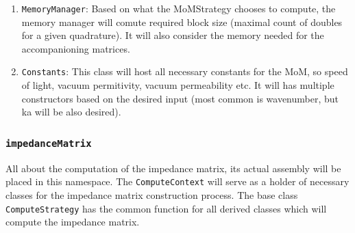 \documentclass[9pt]{article}
\begin{document}
    \begin{enumerate}[label=\Roman*.]
        \item \texttt{MemoryManager}: Based on what the MoMStrategy chooses to compute, the memory manager will comute required block size (maximal count of doubles for a given quadrature). It will also consider the memory needed for the accompanioning matrices.
        \item \texttt{Constants}: This class will host all necessary constants for the MoM, so speed of light, vacuum permitivity, vacuum permeability etc. It will has multiple constructors based on the desired input (most common is wavenumber, but ka will be also desired).
    \end{enumerate}

    \subsubsection{\texttt{impedanceMatrix}}

    All about the computation of the impedance matrix, its actual assembly will be placed in this namespace. The \texttt{ComputeContext} will serve as a holder of necessary classes for the impedance matrix construction process. The base class \texttt{ComputeStrategy} has the common function for all derived classes which will compute the impedance matrix.
\end{document}
